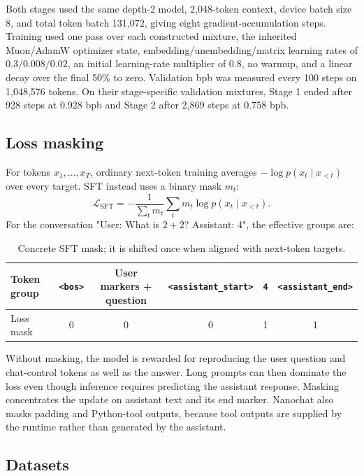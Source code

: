 \documentclass{article}
\begin{document}
Both stages used the same depth-2 model, 2,048-token context, device batch size
8, and total token batch 131,072, giving eight gradient-accumulation steps.
Training used one pass over each constructed mixture, the inherited Muon/AdamW
optimizer state, embedding/unembedding/matrix learning rates of
$0.3/0.008/0.02$, an initial learning-rate multiplier of 0.8, no warmup, and a
linear decay over the final 50\% to zero. Validation bpb was measured every 100
steps on 1,048,576 tokens. On their stage-specific validation mixtures, Stage 1
ended after 928 steps at 0.928 bpb and Stage 2 after 2,869 steps at 0.758 bpb.

\subsection{Loss masking}

For tokens $x_1,\ldots,x_T$, ordinary next-token training averages
$-\log p(x_t\mid x_{<t})$ over every target. SFT instead uses a binary mask
$m_t$:
\[
\mathcal{L}_{\mathrm{SFT}}=
-\frac{1}{\sum_t m_t}\sum_t m_t\log p(x_t\mid x_{<t}).
\]
For the conversation "User: What is $2+2$? Assistant: 4", the effective groups
are:

\begin{table}[t]
\centering
\small
\caption{Concrete SFT mask; it is shifted once when aligned with next-token targets.}
\label{tab:sft-mask}
\begin{tabular}{@{}lccccc@{}}
\toprule
Token group & \texttt{<bos>} & User markers + question & \texttt{<assistant\_start>}
& \texttt{4} & \texttt{<assistant\_end>} \\
\midrule
Loss mask & 0 & 0 & 0 & 1 & 1 \\
\bottomrule
\end{tabular}
\end{table}

Without masking, the model is rewarded for reproducing the user question and
chat-control tokens as well as the answer. Long prompts can then dominate the
loss even though inference requires predicting the assistant response. Masking
concentrates the update on assistant text and its end marker. Nanochat also
masks padding and Python-tool outputs, because tool outputs are supplied by the
runtime rather than generated by the assistant.

\subsection{Datasets}
\end{document}
